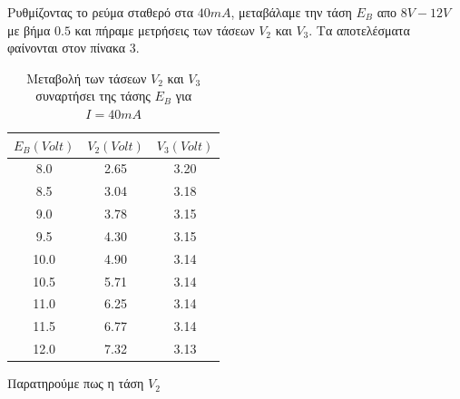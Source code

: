 \documentclass[a4paper,12pt,titlepage]{article}
\begin{document}
\newpage

Ρυθμίζοντας το ρεύμα σταθερό στα $40 mA$, μεταβάλαμε την τάση $E_{B}$ απο $8V-12V$ με βήμα $0.5$ και πήραμε μετρήσεις των τάσεων $V_{2}$ και $V_{3}$. Τα αποτελέσματα φαίνονται στον πίνακα 3.

\begin{table}[h!]
\begin{center}
    \begin{tabular}{ | c | c | c |}
    \hline
     $E_{B}(Volt)$ & $V_{2} (Volt)$ & $V_{3} (Volt)$\\ \hline
     8.0  	& 2.65	& 3.20 \\ \hline
     8.5  	& 3.04	& 3.18 \\ \hline
     9.0  	& 3.78	& 3.15 \\ \hline
     9.5  	& 4.30	& 3.15 \\ \hline
     10.0 	& 4.90	& 3.14 \\ \hline
     10.5 	& 5.71	& 3.14 \\ \hline
     11.0 	& 6.25	& 3.14 \\ \hline
     11.5 	& 6.77	& 3.14 \\ \hline
     12.0 	& 7.32	& 3.13 \\ \hline
    \end{tabular}
\end{center}
\caption{Μεταβολή των τάσεων $V_{2}$ και $V_{3}$ συναρτήσει της τάσης $E_{B}$ για $I=40mA$}
\end{table}

Παρατηρούμε πως η τάση $V_{2}$
\end{document}
